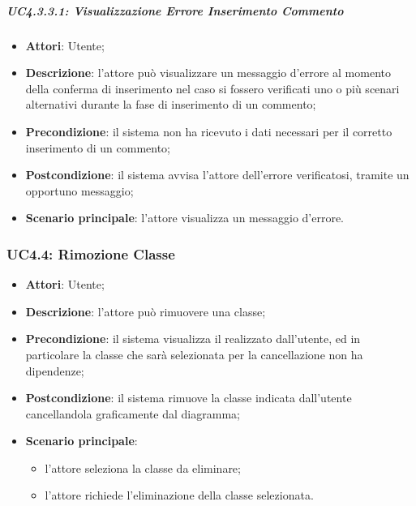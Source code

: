 \subparagraph{UC4.3.3.1: Visualizzazione Errore Inserimento Commento}
\label{UC4.3.3.1}
\begin{itemize}
	\item \textbf{Attori}: Utente;
	\item \textbf{Descrizione}: l'attore può visualizzare un messaggio d'errore al momento della conferma di inserimento nel caso si fossero verificati uno o più scenari alternativi durante la fase di inserimento di un commento;
	\item \textbf{Precondizione}: il sistema non ha ricevuto i dati necessari per il corretto inserimento di un commento;
	\item \textbf{Postcondizione}: il sistema avvisa l'attore dell'errore verificatosi, tramite un opportuno messaggio;
	\item \textbf{Scenario principale}: l'attore visualizza un messaggio d'errore.
\end{itemize}

\subsubsection{UC4.4: Rimozione Classe}
\label{UC4.4}
\begin{itemize}
	\item \textbf{Attori}: Utente;
	\item \textbf{Descrizione}: l'attore può rimuovere una classe;
	\item \textbf{Precondizione}: il sistema visualizza il  realizzato dall'utente, ed in particolare la classe che sarà selezionata per la cancellazione non ha dipendenze;
	\item \textbf{Postcondizione}: il sistema rimuove la classe indicata dall'utente cancellandola graficamente dal diagramma;
	\item \textbf{Scenario principale}:
	\begin{itemize}
		\item l'attore seleziona la classe da eliminare;
		\item l'attore richiede l'eliminazione della classe selezionata.
	\end{itemize}
\end{itemize}

